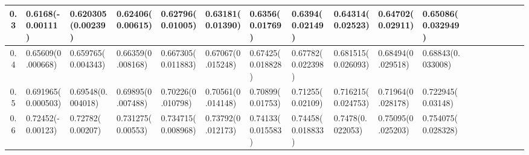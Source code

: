 \documentclass[
	article,			%
	12pt,				%
	twoside,			%
	a4paper,			%
	english,			%
	brazil,				%
	]{abntex2}
\begin{document}
\begin{landscape}
\begin{table}
\begin{tabular}{c||p{18mm}|p{18mm}|p{18mm}|p{18mm}|p{18mm}|p{18mm}|p{18mm}|p{18mm}|p{18mm}|p{18mm}|p{18mm}|p{18mm}|p{18mm}|p{18mm}|p{18mm}|p{18mm}|p{18mm}}
    			\hline
    			0.3 & 0.6168\newline(-0.00111)&0.620305\newline(0.00239)&0.62406\newline(0.00615)&0.62796\newline(0.01005)&0.63181\newline(0.01390)&0.6356\newline(0.01769)&0.6394\newline(0.02149)&0.64314\newline(0.02523)&0.64702\newline(0.02911)&0.65086\newline(0.032949)\\
    			\hline 
    			0.4 & 0.65609\newline(0.000668)&0.659765\newline(0.004343)&0.66359\newline(0.008168)&0.667305\newline(0.011883)&0.67067\newline(0.015248)&0.67425\newline(0.018828)&0.67782\newline(0.022398)&0.681515\newline(0.026093)&0.68494\newline(0.029518)&0.68843\newline(0.033008)\\
    			\hline 
    			0.5 & 0.691965\newline(0.000503)&0.69548\newline(0.004018)&0.69895\newline(0.007488)&0.70226\newline(0.010798)&0.70561\newline(0.014148)&0.70899\newline(0.01753)&0.71255\newline(0.02109)&0.716215\newline(0.024753)&0.71964\newline(0.028178)&0.722945\newline(0.03148)\\
    			\hline\hline 
    			0.6 & 0.72452\newline(-0.00123)&0.72782\newline( 0.00207)&0.731275\newline( 0.00553)&0.734715\newline(0.008968)&0.73792\newline(0.012173)&0.74133\newline(0.015583)&0.74458\newline(0.018833)&0.7478\newline(0.022053)&0.75095\newline(0.025203)&0.754075\newline(0.028328)\\

\end{tabular}
\end{table}
\end{landscape}
\end{document}
